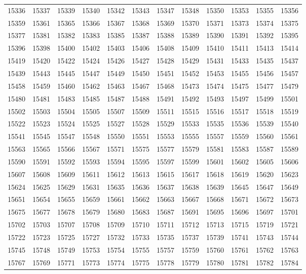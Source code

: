 \begin{center}
\begin{longtable}{llllllllllll}
15336 &15337 &15339 &15340 &15342 &15343 &15347 &15348 &15350 &15353 &15355 &15356 \\
15359 &15361 &15365 &15366 &15367 &15368 &15369 &15370 &15371 &15373 &15374 &15375 \\
15377 &15381 &15382 &15383 &15385 &15387 &15388 &15389 &15390 &15391 &15392 &15395 \\
15396 &15398 &15400 &15402 &15403 &15406 &15408 &15409 &15410 &15411 &15413 &15414 \\
15419 &15420 &15422 &15424 &15426 &15427 &15428 &15429 &15431 &15433 &15435 &15437 \\
15439 &15443 &15445 &15447 &15449 &15450 &15451 &15452 &15453 &15455 &15456 &15457 \\
15458 &15459 &15460 &15462 &15463 &15467 &15468 &15473 &15474 &15475 &15477 &15479 \\
15480 &15481 &15483 &15485 &15487 &15488 &15491 &15492 &15493 &15497 &15499 &15501 \\
15502 &15503 &15504 &15505 &15507 &15509 &15511 &15515 &15516 &15517 &15518 &15519 \\
15522 &15523 &15524 &15525 &15527 &15528 &15529 &15533 &15535 &15536 &15539 &15540 \\
15541 &15545 &15547 &15548 &15550 &15551 &15553 &15555 &15557 &15559 &15560 &15561 \\
15563 &15565 &15566 &15567 &15571 &15575 &15577 &15579 &15581 &15583 &15587 &15589 \\
15590 &15591 &15592 &15593 &15594 &15595 &15597 &15599 &15601 &15602 &15605 &15606 \\
15607 &15608 &15609 &15611 &15612 &15613 &15615 &15617 &15618 &15619 &15620 &15623 \\
15624 &15625 &15629 &15631 &15635 &15636 &15637 &15638 &15639 &15645 &15647 &15649 \\
15651 &15654 &15655 &15659 &15661 &15662 &15663 &15667 &15668 &15671 &15672 &15673 \\
15675 &15677 &15678 &15679 &15680 &15683 &15687 &15691 &15695 &15696 &15697 &15701 \\
15702 &15703 &15707 &15708 &15709 &15710 &15711 &15712 &15713 &15715 &15719 &15721 \\
15722 &15723 &15725 &15727 &15732 &15733 &15735 &15737 &15739 &15741 &15743 &15744 \\
15745 &15748 &15749 &15753 &15754 &15755 &15757 &15759 &15760 &15761 &15762 &15763 \\
15767 &15769 &15771 &15773 &15774 &15775 &15778 &15779 &15780 &15781 &15782 &15784 \\

\end{longtable}
\end{center}

